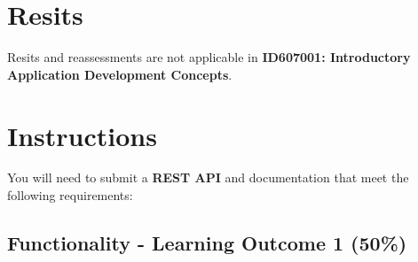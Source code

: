 \documentclass{article}
\begin{document}
\section*{Resits}
Resits and reassessments are not applicable in \textbf{ID607001: Introductory Application Development Concepts}. 

\newpage

\section*{Instructions}
You will need to submit a \textbf{REST API} and documentation that meet the following requirements: \\

\subsection*{Functionality - Learning Outcome 1 (50\%)}
\end{document}
